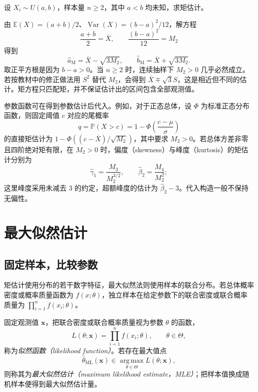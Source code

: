 \begin{example}
\label{ex:study-uniform-moments}
设 $X_i\sim U(a,b)$，样本量 $n\ge2$，其中 $a<b$ 均未知，求矩估计。
\end{example}

\begin{solve}
由 $\mathbb E(X)=(a+b)/2$、$\operatorname{Var}(X)=(b-a)^2/12$，解方程
\[
  \frac{a+b}{2}=\overline X,\qquad
  \frac{(b-a)^2}{12}=M_2
\]
得到
\begin{equation}
  \widehat a_{\mathrm M}=\overline X-\sqrt{3M_2},\qquad
  \widehat b_{\mathrm M}=\overline X+\sqrt{3M_2}.
  \label{eq:study-uniform-moment-estimates}
\end{equation}
取正平方根是因为 $b-a>0$。当 $n\ge2$ 时，连续抽样下 $M_2>0$ 几乎必然成立。若按教材中的修正做法用 $S^2$ 替代 $M_2$，会得到 $\overline X\mp\sqrt3S$，这是相近但不同的估计。矩方程只匹配矩，并不保证估计出的区间包含全部观测值。
\end{solve}

参数函数可在得到参数估计后代入。例如，对于正态总体，设 $\Phi$ 为标准正态分布函数，则固定阈值 $c$ 对应的尾概率
\[
  q=\mathbb P(X>c)=1-\Phi\!\left(\frac{c-\mu}{\sigma}\right)
\]
的直接矩估计为 $1-\Phi((c-\overline X)/\sqrt{M_2})$，其中要求 $M_2>0$。若总体方差非零且四阶绝对矩有限，在 $M_2>0$ 时，偏度（skewness）与峰度（kurtosis）的矩估计分别为
\[
  \widehat\gamma_1=\frac{M_3}{M_2^{3/2}},\qquad
  \widehat\beta_2=\frac{M_4}{M_2^2};
\]
这里峰度采用未减去 $3$ 的约定，超额峰度的估计为 $\widehat\beta_2-3$。代入构造一般不保持无偏性。

\section{最大似然估计}
\label{sec:study-maximum-likelihood}

\subsection{固定样本，比较参数}

矩估计使用分布的若干数字特征，最大似然法则使用样本的联合分布。若总体概率密度或概率质量函数为 $f(x;\theta)$，独立样本在给定参数下的联合密度或联合概率质量为 $\prod_{i=1}^nf(x_i;\theta)$。

\begin{definition}[似然函数与最大似然估计]
\label{def:study-likelihood-mle}
固定观测值 $\boldsymbol x$，把联合密度或联合概率质量视为参数 $\theta$ 的函数，
\begin{equation}
  L(\theta;\boldsymbol x)=\prod_{i=1}^nf(x_i;\theta),
  \qquad\theta\in\Theta,
  \label{eq:study-likelihood}
\end{equation}
称为\emph{似然函数（likelihood function）}。若存在最大值点
\begin{equation}
  \widehat\theta_{\mathrm{ML}}(\boldsymbol x)
    \in\operatorname*{arg\,max}_{\theta\in\Theta}
       L(\theta;\boldsymbol x),
  \label{eq:study-mle-definition}
\end{equation}
则称其为\emph{最大似然估计（maximum likelihood estimate，MLE）}；把样本值换成随机样本便得到最大似然估计量。
\end{definition}

